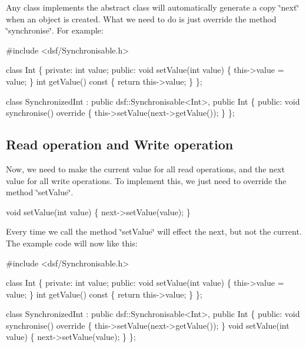  Any class implements the abstract class will automatically generate a copy \char`\"{}next\char`\"{} when an object is created. What we need to do is just override the method \char`\"{}synchronise\char`\"{}. For example\+: 
\begin{DoxyCode}
\textcolor{preprocessor}{#include <dsf/Synchronisable.h>}

\textcolor{keyword}{class }Int
\{
\textcolor{keyword}{private}:
    \textcolor{keywordtype}{int} value;
\textcolor{keyword}{public}:
    \textcolor{keywordtype}{void} setValue(\textcolor{keywordtype}{int} value)
    \{
        this->value = value;
    \}
    \textcolor{keywordtype}{int} getValue()\textcolor{keyword}{ const}
\textcolor{keyword}{    }\{
        \textcolor{keywordflow}{return} this->value;
    \}
\};

\textcolor{keyword}{class }SynchronizedInt : \textcolor{keyword}{public} dsf::Synchronisable<Int>, \textcolor{keyword}{public} Int
\{
\textcolor{keyword}{public}:
    \textcolor{keywordtype}{void} synchronise()\textcolor{keyword}{ override}
\textcolor{keyword}{    }\{
        this->setValue(next->getValue());
    \}
\};
\end{DoxyCode}
\hypertarget{_conformanceto_specificationand_design_manual_Implementationrnd}{}\subsection{Read operation and Write operation}\label{_conformanceto_specificationand_design_manual_Implementationrnd}
Now, we need to make the current value for all read operations, and the next value for all write operations. To implement this, we just need to override the method \char`\"{}set\+Value\char`\"{}. 
\begin{DoxyCode}
\textcolor{keywordtype}{void} setValue(\textcolor{keywordtype}{int} value)
\{
    next->setValue(value);
\}
\end{DoxyCode}
 Every time we call the method \char`\"{}set\+Value\char`\"{} will effect the next, but not the current. The example code will now like this\+: 
\begin{DoxyCodeInclude}
\textcolor{preprocessor}{#include <dsf/Synchronisable.h>}

\textcolor{keyword}{class }Int
\{
\textcolor{keyword}{private}:
    \textcolor{keywordtype}{int} value;
\textcolor{keyword}{public}:
    \textcolor{keywordtype}{void} setValue(\textcolor{keywordtype}{int} value)
    \{
        this->value = value;
    \}
    \textcolor{keywordtype}{int} getValue()\textcolor{keyword}{ const}
\textcolor{keyword}{    }\{
        \textcolor{keywordflow}{return} this->value;
    \}
\};

\textcolor{keyword}{class }SynchronizedInt : \textcolor{keyword}{public} dsf::Synchronisable<Int>, \textcolor{keyword}{public} Int
\{
\textcolor{keyword}{public}:
    \textcolor{keywordtype}{void} synchronise()\textcolor{keyword}{ override}
\textcolor{keyword}{    }\{
        this->setValue(next->getValue());
    \}
    \textcolor{keywordtype}{void} setValue(\textcolor{keywordtype}{int} value)
    \{
        next->setValue(value);
    \}
\};
\end{DoxyCodeInclude}
